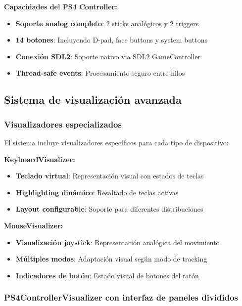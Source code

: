 \textbf{Capacidades del PS4 Controller:}
\begin{itemize}
    \item \textbf{Soporte analog completo}: 2 sticks analógicos y 2 triggers
    \item \textbf{14 botones}: Incluyendo D-pad, face buttons y system buttons
    \item \textbf{Conexión SDL2}: Soporte nativo via SDL2 GameController
    \item \textbf{Thread-safe events}: Procesamiento seguro entre hilos
\end{itemize}

\subsection{Sistema de visualización avanzada}
\label{subsec:visualizacion_input_collector}

\subsubsection{Visualizadores especializados}

El sistema incluye visualizadores específicos para cada tipo de dispositivo:

\textbf{KeyboardVisualizer:}
\begin{itemize}
    \item \textbf{Teclado virtual}: Representación visual con estados de teclas
    \item \textbf{Highlighting dinámico}: Resaltado de teclas activas
    \item \textbf{Layout configurable}: Soporte para diferentes distribuciones
\end{itemize}

\textbf{MouseVisualizer:}
\begin{itemize}
    \item \textbf{Visualización joystick}: Representación analógica del movimiento
    \item \textbf{Múltiples modos}: Adaptación visual según modo de tracking
    \item \textbf{Indicadores de botón}: Estado visual de botones del ratón
\end{itemize}

\subsubsection{PS4ControllerVisualizer con interfaz de paneles divididos}

